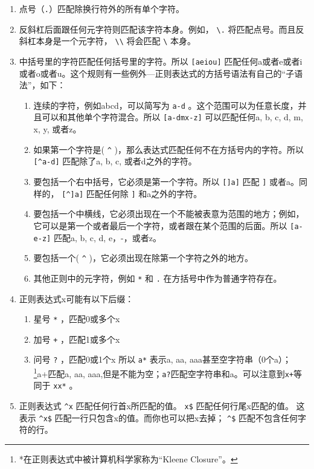 \begin{enumerate}
  \item 点号（\verb|.|）匹配除换行符外的所有单个字符。
  \item 反斜杠后面跟任何元字符则匹配该字符本身。例如， \verb|\.| 将匹配点号。而且反斜杠本身是一个元字符， \verb|\\| 将会匹配 \verb|\| 本身。
  \item 中括号里的字符匹配任何括号里的字符。所以 \verb|[aeiou]| 匹配任何a或者e或者i或者o或者u。这个规则有一些例外---正则表达式的方括号语法有自己的“子语法”，如下：
  \begin{enumerate}
    \item 连续的字符，例如abcd，可以简写为 \verb|a-d| 。这个范围可以为任意长度，并且可以和其他单个字符混合。所以 \verb|[a-dmx-z]| 可以匹配任何a, b, c, d, m, x, y, 或者z。
    \item 如果第一个字符是( \verb|^| )，那么表达式匹配任何不在方括号内的字符。所以 \verb|[^a-d]| 匹配除了a, b, c, 或者d之外的字符。
    \item 要包括一个右中括号，它必须是第一个字符。所以 \verb|[]a]| 匹配 \verb|]| 或者a。同样的， \verb|[^]a]| 匹配任何除 \verb|]| 和a之外的字符。
    \item 要包括一个中横线，它必须出现在一个不能被表意为范围的地方；例如，它可以是第一个或者最后一个字符，或者跟在某个范围的后面。所以 \verb|[a-e-z]| 匹配a, b, c, d, e，-，或者z。
    \item 要包括一个( \verb|^| )，它必须出现在除第一个字符之外的地方。
    \item 其他正则中的元字符，例如 \verb|*| 和 \verb|.| 在方括号中作为普通字符存在。
  \end{enumerate}
  \item 正则表达式x可能有以下后缀：
  \begin{enumerate}
    \item 星号 \verb|*| ，匹配0或多个x
    \item 加号 \verb|+| ，匹配1或多个x
    \item 问号 \verb|?| ，匹配0或1个x
    所以 \verb|a*| 表示a, aa, aaa甚至空字符串（0个a）；\footnote{*在正则表达式中被计算机科学家称为“Kleene Closure”。}a+匹配a, aa, aaa,但是不能为空；\texttt{a?}匹配空字符串和a。可以注意到\texttt{x+}等同于 \texttt{xx*} 。
  \end{enumerate}
  \item 正则表达式 \verb|^x| 匹配任何行首x所匹配的值。
   \verb|x$| 匹配任何行尾x匹配的值。
   这表示 \verb|^x$| 匹配一行只包含x的值。而你也可以把x去掉； \verb|^$| 匹配不包含任何字符的行。

\end{enumerate}
